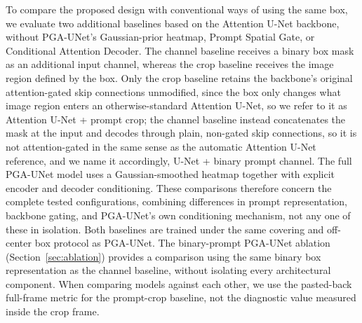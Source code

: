 To compare the proposed design with conventional ways of using the same box, we evaluate two additional baselines based on the Attention U-Net backbone, without PGA-UNet's Gaussian-prior heatmap, Prompt Spatial Gate, or Conditional Attention Decoder. The channel baseline receives a binary box mask as an additional input channel, whereas the crop baseline receives the image region defined by the box. Only the crop baseline retains the backbone's original attention-gated skip connections unmodified, since the box only changes what image region enters an otherwise-standard Attention U-Net, so we refer to it as Attention U-Net + prompt crop; the channel baseline instead concatenates the mask at the input and decodes through plain, non-gated skip connections, so it is not attention-gated in the same sense as the automatic Attention U-Net reference, and we name it accordingly, U-Net + binary prompt channel. The full PGA-UNet model uses a Gaussian-smoothed heatmap together with explicit encoder and decoder conditioning. These comparisons therefore concern the complete tested configurations, combining differences in prompt representation, backbone gating, and PGA-UNet's own conditioning mechanism, not any one of these in isolation. Both baselines are trained under the same covering and off-center box protocol as PGA-UNet. The binary-prompt PGA-UNet ablation (Section~\ref{sec:ablation}) provides a comparison using the same binary box representation as the channel baseline, without isolating every architectural component. When comparing models against each other, we use the pasted-back full-frame metric for the prompt-crop baseline, not the diagnostic value measured inside the crop frame.

